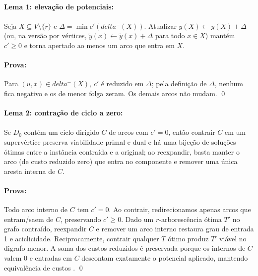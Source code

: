 \documentclass[12pt,a4paper]{article}
\def\emph#1{#1}%
\def\delta{delta}%
\begin{document}
\paragraph{Lema 1: elevação de potenciais:}
\paragraph{} 

Seja \(X\subseteq V\setminus\{r\}\) e \(\Delta=\min c'(\delta^-(X))\). Atualizar \(y(X)\gets y(X)+\Delta\) (ou, na versão por vértices, \(\tilde y(x)\gets \tilde y(x)+\Delta\) para todo \(x\in X\)) mantém \(c'\ge 0\) e torna \emph{apertado} ao menos um arco que entra em \(X\).\newline

\paragraph{Prova:} Para \((u,x)\in \delta^-(X)\), \(c'\) é reduzido em \(\Delta\); pela definição de \(\Delta\), nenhum fica negativo e os de menor folga zeram. Os demais arcos não mudam. \qed

\paragraph{Lema 2: contração de ciclo a zero:} 
\paragraph{}
Se \(D_0\) contém um ciclo dirigido \(C\) de arcos com \(c'=0\), então contrair \(C\) em um supervértice preserva viabilidade primal e dual e há uma bijeção de soluções ótimas entre a instância contraída e a original; ao reexpandir, basta manter o arco (de custo reduzido zero) que entra no componente e remover uma única aresta interna de \(C\).

\paragraph{Prova:} Todo arco interno de \(C\) tem \(c'=0\). Ao contrair, redirecionamos apenas arcos que entram/saem de \(C\), preservando \(c'\ge 0\). Dado um \(r\)-arborescência ótima \(T'\) no grafo contraído, reexpandir \(C\) e remover um arco interno restaura grau de entrada 1 e aciclicidade. Reciprocamente, contrair qualquer \(T\) ótimo produz \(T'\) viável no digrafo menor. A soma dos custos reduzidos é preservada porque os internos de \(C\) valem 0 e entradas em \(C\) descontam exatamente o potencial aplicado, mantendo equivalência de custos \cite[Sec.~4.9]{schrijver2003comb}. \qed
\end{document}
